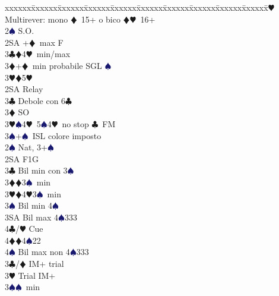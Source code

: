 \documentclass[a4paper,italian]{article}
\newcommand{\BC}{\textcolor{OliveGreen}{$\clubsuit$}}
\newcommand{\BD}{\textcolor{RedOrange}{$\vardiamondsuit$}}
\newcommand{\BH}{\textcolor{Red2}{$\varheartsuit${}}}
\newcommand{\BS}{\textcolor{MidnightBlue}{$\spadesuit${}}}
\newenvironment{bidtable}
{\begin{tabbing}

    xxxxxx\=xxxxxx\=xxxxxx\=xxxxxx\=xxxxxx\=xxxxxx\=xxxxxx\=xxxxxx\=xxxxxx\=xxxxxx\=\kill}
{\end{tabbing} }%
\begin{document}
\begin{multicols}{2}
\begin{bidtable}
                                            2\BH \> Multirever: mono \BD\ 15+ o bico \BD \BH\ 16+\+\\
                                            2\BS \> S.O.\+\\
                                            2SA +\BD\ max F\\
                                            3\BC {}\BD4\BH\ min/max\\
                                            3\BD {}+\BD\ min probabile SGL \BS \\
                                            3\BH {}\BD5\BH\-\\
                                            2SA \> Relay \\
                                            3\BC \> Debole con 6\BC \\
                                            3\BD \> SO\\
                                            3\BH {}\BS 4\BH\ 5\BS 4\BH\ no stop \BC\ FM\\
                                            3\BS {}+\BS\ ISL colore imposto\-\\
                                            2\BS \> Nat, 3+\BS \+\\
                                            2SA \> F1G\+\\
                                            3\BC \> Bil min con 3\BS \\
                                            3\BD {}\BD 3\BS\ min\\
                                            3\BH {}\BD 4\BH 3\BS\ min\\
                                            3\BS \> Bil min 4\BS \\
                                            3SA \> Bil max 4\BS 333\\
                                            4\BC/\BH \> Cue\\
                                            4\BD {}\BD 4\BS 22\\
                                            4\BS \> Bil max non 4\BS 333\-\\
                                            3\BC/\BD \> IM+ trial\\
                                            3\BH \> Trial IM+\+\\
                                            3\BS {}\BS\ min\\

\end{bidtable}
\end{multicols}
\end{document}

